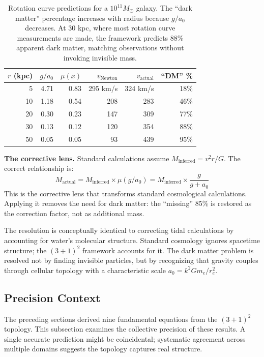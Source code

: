 \documentclass[aps,prd,preprint,superscriptaddress,showpacs,preprintnumbers,amsmath,amssymb,nofootinbib]{revtex4-2}
\begin{document}
\begin{table}[H]
\centering
\begin{tabular*}{\textwidth}{@{\extracolsep{\fill}} rrrrrr @{}}
\toprule
$r$ (kpc) & $g/a_0$ & $\mu(x)$ & $v_{\text{Newton}}$ & $v_{\text{actual}}$ & ``DM'' \% \\
\midrule
5 & 4.71 & 0.83 & 295 km/s & 324 km/s & 18\% \\
10 & 1.18 & 0.54 & 208 & 283 & 46\% \\
20 & 0.30 & 0.23 & 147 & 309 & 77\% \\
30 & 0.13 & 0.12 & 120 & 354 & 88\% \\
50 & 0.05 & 0.05 & 93 & 439 & 95\% \\
\bottomrule
\end{tabular*}
\caption{Rotation curve predictions for a $10^{11} M_\odot$ galaxy. The ``dark matter'' percentage increases with radius because $g/a_0$ decreases. At 30 kpc, where most rotation curve measurements are made, the framework predicts 88\% apparent dark matter, matching observations without invoking invisible mass.}
\label{tab:darkmatter}
\end{table}

\textbf{The corrective lens.} Standard calculations assume $M_{\text{inferred}} = v^2 r / G$. The correct relationship is:
\begin{equation}
M_{\text{actual}} = M_{\text{inferred}} \times \mu(g/a_0) = M_{\text{inferred}} \times \frac{g}{g + a_0}
\label{eq:corrective-lens}
\end{equation}
This is the corrective lens that transforms standard cosmological calculations. Applying it removes the need for dark matter: the ``missing'' 85\% is restored as the correction factor, not as additional mass.

The resolution is conceptually identical to correcting tidal calculations by accounting for water's molecular structure. Standard cosmology ignores spacetime structure; the $(3+1)^2$ framework accounts for it. The dark matter problem is resolved not by finding invisible particles, but by recognizing that gravity couples through cellular topology with a characteristic scale $a_0 = k^2 G m_e / r_e^2$.

\subsection{Precision Context}
\label{subsec:precision}

The preceding sections derived nine fundamental equations from the $(3+1)^2$ topology. This subsection examines the collective precision of these results. A single accurate prediction might be coincidental; systematic agreement across multiple domains suggests the topology captures real structure.
\end{document}
